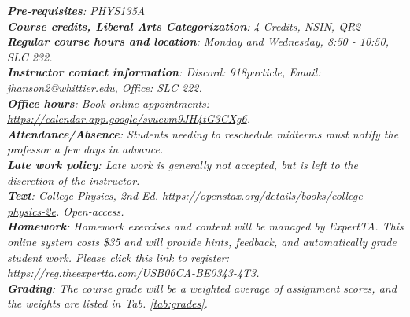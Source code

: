 \documentclass[10pt]{article}
\begin{document}
\maketitle

\begin{abstract}
The concepts of algebra-based electromagnetism, optics, and modern physics will be presented within the context of interactive problem-solving.  The course will begin with the concepts of electric charge, electrostatics, electric potential, and capacitance.  Next, current and DC circuits will be covered.  Magnetostatics and magnetic induction follow DC circuits, concluding with AC circuits.  Finally, seleted topics in electromagnetic waves, optics, and modern medicine will be presented.  The course work will include interactive computational exercises, analytic textbook problems, group-designed projects, and lab-based activities.
\end{abstract}
\noindent
\textit{\textbf{Pre-requisites}: PHYS135A} \\
\textit{\textbf{Course credits, Liberal Arts Categorization}: 4 Credits, NSIN, QR2} \\
\textit{\textbf{Regular course hours and location}: Monday and Wednesday, 8:50 - 10:50, SLC 232.} \\
\textit{\textbf{Instructor contact information}: Discord: 918particle, Email: jhanson2@whittier.edu, Office: SLC 222.} \\
\noindent
\textit{\textbf{Office hours}: Book online appointments: \url{https://calendar.app.google/svuevm9JH4tG3CXg6}.} \\
\textit{\textbf{Attendance/Absence}: Students needing to reschedule midterms must notify the professor a few days in advance.} \\ 
\textit{\textbf{Late work policy}: Late work is generally not accepted, but is left to the discretion of the instructor.} \\
\textit{\textbf{Text}: College Physics, 2nd Ed. \url{https://openstax.org/details/books/college-physics-2e}. Open-access.} \\
\textit{\textbf{Homework}: Homework exercises and content will be managed by ExpertTA.  This online system costs \$35 and will provide hints, feedback, and automatically grade student work.  Please click this link to register: \url{https://reg.theexpertta.com/USB06CA-BE0343-4T3}.} \\
\textit{\textbf{Grading}: The course grade will be a weighted average of assignment scores, and the weights are listed in Tab. \ref{tab:grades}.}
\end{document}
